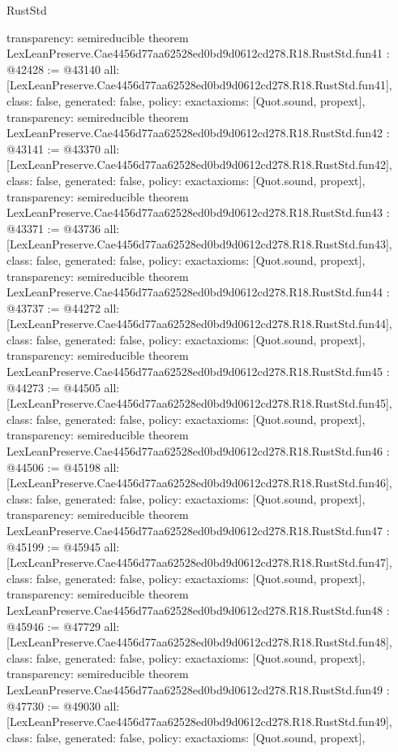 \begin{lexlean}{RustStd}
\begin{coremodule}
{  transparency: semireducible
}
theorem LexLeanPreserve.Cae4456d77aa62528ed0bd9d0612cd278.R18.RustStd.fun41 : @42428 := @43140 {
  all: [LexLeanPreserve.Cae4456d77aa62528ed0bd9d0612cd278.R18.RustStd.fun41],
  class: false,
  generated: false,
  policy: exact{axioms: [Quot.sound, propext]},
  transparency: semireducible
}
theorem LexLeanPreserve.Cae4456d77aa62528ed0bd9d0612cd278.R18.RustStd.fun42 : @43141 := @43370 {
  all: [LexLeanPreserve.Cae4456d77aa62528ed0bd9d0612cd278.R18.RustStd.fun42],
  class: false,
  generated: false,
  policy: exact{axioms: [Quot.sound, propext]},
  transparency: semireducible
}
theorem LexLeanPreserve.Cae4456d77aa62528ed0bd9d0612cd278.R18.RustStd.fun43 : @43371 := @43736 {
  all: [LexLeanPreserve.Cae4456d77aa62528ed0bd9d0612cd278.R18.RustStd.fun43],
  class: false,
  generated: false,
  policy: exact{axioms: [Quot.sound, propext]},
  transparency: semireducible
}
theorem LexLeanPreserve.Cae4456d77aa62528ed0bd9d0612cd278.R18.RustStd.fun44 : @43737 := @44272 {
  all: [LexLeanPreserve.Cae4456d77aa62528ed0bd9d0612cd278.R18.RustStd.fun44],
  class: false,
  generated: false,
  policy: exact{axioms: [Quot.sound, propext]},
  transparency: semireducible
}
theorem LexLeanPreserve.Cae4456d77aa62528ed0bd9d0612cd278.R18.RustStd.fun45 : @44273 := @44505 {
  all: [LexLeanPreserve.Cae4456d77aa62528ed0bd9d0612cd278.R18.RustStd.fun45],
  class: false,
  generated: false,
  policy: exact{axioms: [Quot.sound, propext]},
  transparency: semireducible
}
theorem LexLeanPreserve.Cae4456d77aa62528ed0bd9d0612cd278.R18.RustStd.fun46 : @44506 := @45198 {
  all: [LexLeanPreserve.Cae4456d77aa62528ed0bd9d0612cd278.R18.RustStd.fun46],
  class: false,
  generated: false,
  policy: exact{axioms: [Quot.sound, propext]},
  transparency: semireducible
}
theorem LexLeanPreserve.Cae4456d77aa62528ed0bd9d0612cd278.R18.RustStd.fun47 : @45199 := @45945 {
  all: [LexLeanPreserve.Cae4456d77aa62528ed0bd9d0612cd278.R18.RustStd.fun47],
  class: false,
  generated: false,
  policy: exact{axioms: [Quot.sound, propext]},
  transparency: semireducible
}
theorem LexLeanPreserve.Cae4456d77aa62528ed0bd9d0612cd278.R18.RustStd.fun48 : @45946 := @47729 {
  all: [LexLeanPreserve.Cae4456d77aa62528ed0bd9d0612cd278.R18.RustStd.fun48],
  class: false,
  generated: false,
  policy: exact{axioms: [Quot.sound, propext]},
  transparency: semireducible
}
theorem LexLeanPreserve.Cae4456d77aa62528ed0bd9d0612cd278.R18.RustStd.fun49 : @47730 := @49030 {
  all: [LexLeanPreserve.Cae4456d77aa62528ed0bd9d0612cd278.R18.RustStd.fun49],
  class: false,
  generated: false,
  policy: exact{axioms: [Quot.sound, propext]},
}
\end{coremodule}
\end{lexlean}
